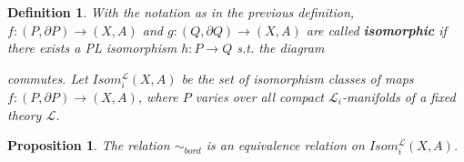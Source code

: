\documentclass[11pt]{book}
\newtheorem{prop}{Proposition}
\newtheorem{definition}{Definition}
\begin{document}
\begin{definition}
With the notation as in the previous definition, $f: (P, \partial P) \to (X,A)$ and $g: (Q, \partial Q) \to (X,A)$ are called \textbf{isomorphic} if there exists a PL isomorphism $h : P \to Q$ s.t. the diagram \newline
\begin{xy}
\end{xy}
\newline
commutes. Let $Isom_{i}^{\mathcal{L}}(X,A)$ be the set of isomorphism classes of maps $f: (P, \partial P) \to (X,A)$, where $P$ varies over all compact $\mathcal{L}_i$-manifolds of a fixed theory $\mathcal{L}$.
\end{definition}

\begin{prop}
The relation $\sim_{bord} $ is an equivalence relation on $Isom_{i}^{\mathcal{L}}(X,A)$.
\end{prop}
\end{document}
